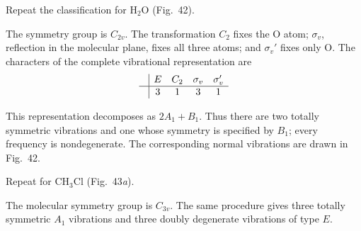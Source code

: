  Repeat the classification for $\mathrm{H_2O}$ (Fig.~42).

\begin{figure}[ht]
\centering
{}
\caption{}
\end{figure}

\SolutionHeading The symmetry group is $C_{2v}$. The transformation $C_2$ fixes the O atom; $\sigma_v$, reflection in the molecular plane, fixes all three atoms; and $\sigma_v'$ fixes only O. The characters of the complete vibrational representation are
\[
\begin{array}{c|cccc}&E&C_2&\sigma_v&\sigma_v'\\\hline&3&1&3&1\end{array}
\]

This representation decomposes as $2A_1+B_1$. Thus there are two totally symmetric vibrations and one whose symmetry is specified by $B_1$; every frequency is nondegenerate. The corresponding normal vibrations are drawn in Fig.~42.

 Repeat for $\mathrm{CH_3Cl}$ (Fig.~43\textit{a}).

\SolutionHeading The molecular symmetry group is $C_{3v}$. The same procedure gives three totally symmetric $A_1$ vibrations and three doubly degenerate vibrations of type $E$.

